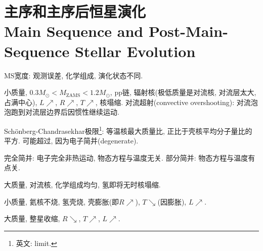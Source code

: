 \chapter{主序和主序后恒星演化\\Main Sequence and Post-Main-Sequence Stellar Evolution}

MS宽度: 观测误差, 化学组成, 演化状态不同.

小质量, $0.3M_\odot<M_\text{ZAMS}<1.2M_\odot$, pp链, 辐射核(极低质量是对流核, 对流层太大, 占满中心), $L\nearrow$, $R\nearrow$, $T\nearrow$, 核塌缩. 对流超射(convective overshooting): 对流泡泡跑到对流层边界后因惯性继续运动.

Sch\"onberg-Chandrasekhar极限\footnote{英文: limit.}: 等温核最大质量比, 正比于壳核平均分子量比的平方. 可能超过, 因为电子简并(degenerate).

完全简并: 电子完全非热运动, 物态方程与温度无关. 部分简并: 物态方程与温度有点关. 

大质量, 对流核, 化学组成均匀, 氢即将无时核塌缩.

小质量, 氦核不烧, 氢壳烧, 壳膨胀(即$R\nearrow$), $T\searrow$(因膨胀), $L\nearrow$.

大质量, 整星收缩, $R\searrow$, $T\nearrow$, $L\nearrow$.


